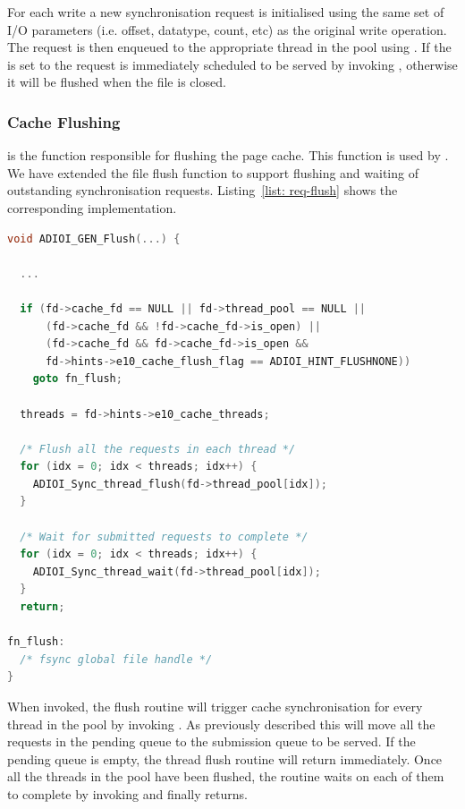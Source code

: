 For each write a new synchronisation request is initialised using the same set of I/O parameters (i.e. offset, datatype, count, etc) as the original write operation. The request is then enqueued to the appropriate thread in the pool using 
. If the  is set to  the request is immediately scheduled to be served by invoking , otherwise it will be 
flushed when the file is closed.

\subsubsection{Cache Flushing}
\label{subsubsec: cache-flush}
 is the function responsible for flushing the page cache. This function is used by . We have extended the file flush function to support flushing and waiting of outstanding synchronisation 
requests. Listing~\ref{list: req-flush} shows the corresponding implementation.

\begin{lstlisting}[language=C, caption=Cache Flushing, label={list: req-flush}]
void ADIOI_GEN_Flush(...) {

  ...

  if (fd->cache_fd == NULL || fd->thread_pool == NULL ||
      (fd->cache_fd && !fd->cache_fd->is_open) ||
      (fd->cache_fd && fd->cache_fd->is_open &&
      fd->hints->e10_cache_flush_flag == ADIOI_HINT_FLUSHNONE))
    goto fn_flush;

  threads = fd->hints->e10_cache_threads;

  /* Flush all the requests in each thread */
  for (idx = 0; idx < threads; idx++) {
    ADIOI_Sync_thread_flush(fd->thread_pool[idx]);
  }

  /* Wait for submitted requests to complete */
  for (idx = 0; idx < threads; idx++) {
    ADIOI_Sync_thread_wait(fd->thread_pool[idx]);
  }
  return;

fn_flush:
  /* fsync global file handle */
}
\end{lstlisting}

When invoked, the flush routine will trigger cache synchronisation for every thread in the pool by invoking . As previously described this will move all the requests in the pending queue to the submission queue to 
be served. If the pending queue is empty, the thread flush routine will return immediately. Once all the threads in the pool have been flushed, the routine waits on each of them to complete by invoking  and finally 
returns.

